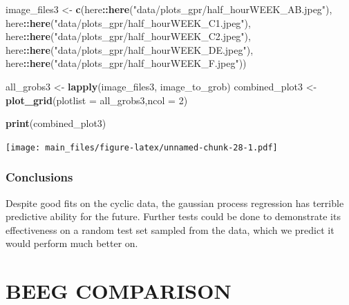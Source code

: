 \documentclass[
]{article}
\newenvironment{Shaded}{\begin{snugshade}}{\end{snugshade}}
\newcommand{\AttributeTok}[1]{\textcolor[rgb]{0.13,0.29,0.53}{#1}}
\newcommand{\DecValTok}[1]{\textcolor[rgb]{0.00,0.00,0.81}{#1}}
\newcommand{\FunctionTok}[1]{\textcolor[rgb]{0.13,0.29,0.53}{\textbf{#1}}}
\newcommand{\NormalTok}[1]{#1}
\newcommand{\OtherTok}[1]{\textcolor[rgb]{0.56,0.35,0.01}{#1}}
\newcommand{\SpecialCharTok}[1]{\textcolor[rgb]{0.81,0.36,0.00}{\textbf{#1}}}
\newcommand{\StringTok}[1]{\textcolor[rgb]{0.31,0.60,0.02}{#1}}
\begin{document}
\begin{Shaded}
\begin{Highlighting}[]
\NormalTok{image\_files3 }\OtherTok{\textless{}{-}} \FunctionTok{c}\NormalTok{(here}\SpecialCharTok{::}\FunctionTok{here}\NormalTok{(}\StringTok{"data/plots\_gpr/half\_hourWEEK\_AB.jpeg"}\NormalTok{),}
\NormalTok{                  here}\SpecialCharTok{::}\FunctionTok{here}\NormalTok{(}\StringTok{"data/plots\_gpr/half\_hourWEEK\_C1.jpeg"}\NormalTok{),}
\NormalTok{                  here}\SpecialCharTok{::}\FunctionTok{here}\NormalTok{(}\StringTok{"data/plots\_gpr/half\_hourWEEK\_C2.jpeg"}\NormalTok{),}
\NormalTok{                  here}\SpecialCharTok{::}\FunctionTok{here}\NormalTok{(}\StringTok{"data/plots\_gpr/half\_hourWEEK\_DE.jpeg"}\NormalTok{),}
\NormalTok{                  here}\SpecialCharTok{::}\FunctionTok{here}\NormalTok{(}\StringTok{"data/plots\_gpr/half\_hourWEEK\_F.jpeg"}\NormalTok{))}

\NormalTok{all\_grobs3 }\OtherTok{\textless{}{-}} \FunctionTok{lapply}\NormalTok{(image\_files3, image\_to\_grob)}
\NormalTok{combined\_plot3 }\OtherTok{\textless{}{-}} \FunctionTok{plot\_grid}\NormalTok{(}\AttributeTok{plotlist =}\NormalTok{ all\_grobs3,}\AttributeTok{ncol =} \DecValTok{2}\NormalTok{)}

\FunctionTok{print}\NormalTok{(combined\_plot3)}
\end{Highlighting}
\end{Shaded}

\texttt{[image: main\_files/figure-latex/unnamed-chunk-28-1.pdf]}

\hypertarget{conclusions-1}{%
\subsubsection{Conclusions}\label{conclusions-1}}

Despite good fits on the cyclic data, the gaussian process regression
has terrible predictive ability for the future. Further tests could be
done to demonstrate its effectiveness on a random test set sampled from
the data, which we predict it would perform much better on.

\hypertarget{beeg-comparison}{%
\section{BEEG COMPARISON}\label{beeg-comparison}}
\end{document}
